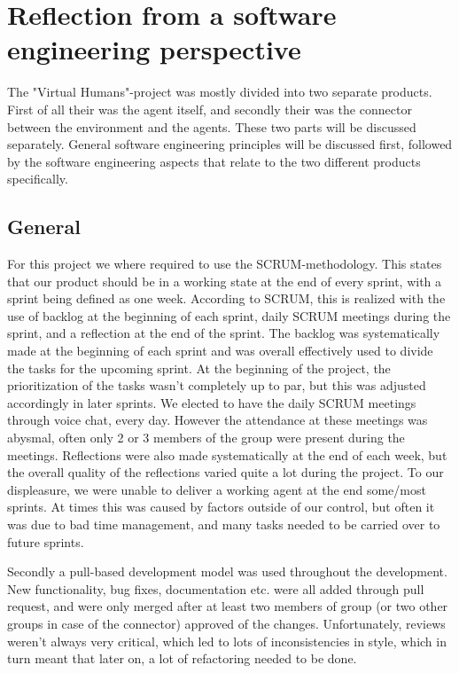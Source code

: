 \chapter[Reflection from a software engineering perspective]{Reflection from a software \\ engineering perspective}
\label{chap:Reflection from a software engineering perspective}

The "Virtual Humans"-project was mostly divided into two separate products.
First of all their was the agent itself, and secondly their was the connector between the environment and the agents.
These two parts will be discussed separately. General software engineering principles will be  discussed first,
followed by the software engineering aspects that relate to the two different products specifically.

\section{General}
\label{sec:General}

For this project we where required to use the SCRUM-methodology. This states that our product should be in a working state at the end of every sprint, with a sprint being defined as one week.
According to SCRUM, this is realized with the use of backlog at the beginning of each sprint, daily SCRUM meetings during the sprint, and a reflection at the end of the sprint.
The backlog was systematically made at the beginning of each sprint and was overall effectively used to divide the tasks for the upcoming sprint.
At the beginning of the project, the prioritization of the tasks wasn't completely up to par, but this was adjusted accordingly in later sprints.
We elected to have the daily SCRUM meetings through voice chat, every day. However the attendance at these meetings was abysmal, often only 2 or 3 members of the group were present during the meetings.
Reflections were also made systematically at the end of each week, but the overall quality of the reflections varied quite a lot during the project.
To our displeasure, we were unable to deliver a working agent at the end some/most sprints. At times this was caused by factors outside of our control, but often it was due to bad time management,
and many tasks needed to be carried over to future sprints.

Secondly a pull-based development model was used throughout the development. New functionality, bug fixes, documentation etc. were all added through pull request, and were only merged after at least
two members of group (or two other groups in case of the connector) approved of the changes.
Unfortunately, reviews weren't always very critical, which led to lots of inconsistencies in style, which in turn meant that later on, a lot of refactoring needed to be done.

